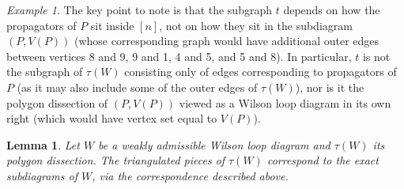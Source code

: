 \documentclass[11pt]{article}
\newtheorem{lem}[thm]{Lemma}
\theoremstyle{remark}
\newtheorem{eg}[thm]{Example}
\theoremstyle{definition}
\begin{document}
\begin{eg}
The key point to note is that the subgraph $t$ depends on how the propagators of $P$ sit inside $[n]$, not on how they sit in the subdiagram $(P,V(P))$ (whose corresponding graph would have additional outer edges between vertices 8 and 9, 9 and 1, 4 and 5, and 5 and 8).  In particular, $t$ is not the subgraph of $\tau(W)$ consisting only of edges corresponding to propagators of $P$ (as it may also include some of the outer edges of $\tau(W)$), nor is it the polygon dissection of $(P,V(P))$ viewed as a Wilson loop diagram in its own right (which would have vertex set equal to $V(P)$).
\end{eg}

\begin{lem}\label{lem triang to exact}
  Let $W$ be a weakly admissible Wilson loop diagram and $\tau(W)$ its polygon dissection.  The triangulated pieces of $\tau(W)$ correspond to the exact subdiagrams of $W$, via the correspondence described above.
\end{lem}
\end{document}
